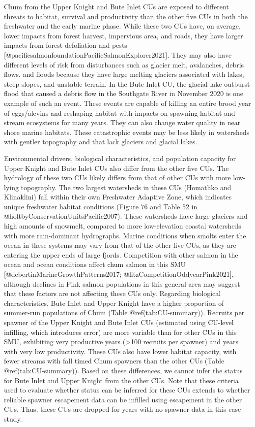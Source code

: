 \documentclass[
]{article}
\begin{document}
Chum from the Upper Knight and Bute Inlet CUs are exposed to different
threats to habitat, survival and productivity than the other five CUs in
both the freshwater and the early marine phase. While these two CUs
have, on average, lower impacts from forest harvest, impervious area,
and roads, they have larger impacts from forest defoliation and pests
{[}@pacificsalmonfoundationPacificSalmonExplorer2021{]}. They may also
have different levels of risk from disturbances such as glacier melt,
avalanches, debris flows, and floods because they have large melting
glaciers associated with lakes, steep slopes, and unstable terrain. In
the Bute Inlet CU, the glacial lake outburst flood that caused a debris
flow in the Southgate River in November 2020 is one example of such an
event. These events are capable of killing an entire brood year of
eggs/alevins and reshaping habitat with impacts on spawning habitat and
stream ecosystems for many years. They can also change water quality in
near shore marine habitats. These catastrophic events may be less likely
in watersheds with gentler topography and that lack glaciers and glacial
lakes.

Environmental drivers, biological characteristics, and population
capacity for Upper Knight and Bute Inlet CUs also differ from the other
five CUs. The hydrology of these two CUs likely differs from that of
other CUs with more low-lying topography. The two largest watersheds in
these CUs (Homathko and Klinaklini) fall within their own Freshwater
Adaptive Zone, which indicates unique freshwater habitat conditions
(Figure 76 and Table 52 in @holtbyConservationUnitsPacific2007). These
watersheds have large glaciers and high amounts of snowmelt, compared to
more low-elevation coastal watersheds with more rain-dominant
hydrographs. Marine conditions when smolts enter the ocean in these
systems may vary from that of the other five CUs, as they are entering
the upper ends of large fjords. Competition with other salmon in the
ocean and ocean conditions affect chum salmon in this SMU
{[}@debertinMarineGrowthPatterns2017;
@litzCompetitionOddyearPink2021{]}, although declines in Pink salmon
populations in this general area may suggest that these factors are not
affecting these CUs only. Regarding biological characteristics, Bute
Inlet and Upper Knight have a higher proportion of summer-run
populations of Chum (Table @ref(tab:CU-summary)). Recruits per spawner
of the Upper Knight and Bute Inlet CUs (estimated using CU-level
infilling, which introduces error) are more variable than for other CUs
in this SMU, exhibiting very productive years (\textgreater100 recruits
per spawner) and years with very low productivity. These CUs also have
lower habitat capacity, with fewer streams with fall timed Chum spawners
than the other CUs (Table @ref(tab:CU-summary)). Based on these
differences, we cannot infer the status for Bute Inlet and Upper Knight
from the other CUs. Note that these criteria used to evaluate whether
status can be inferred for these CUs extends to whether reliable spawner
escapement data can be infilled using escapement in the other CUs. Thus,
these CUs are dropped for years with no spawner data in this case study.
\end{document}
